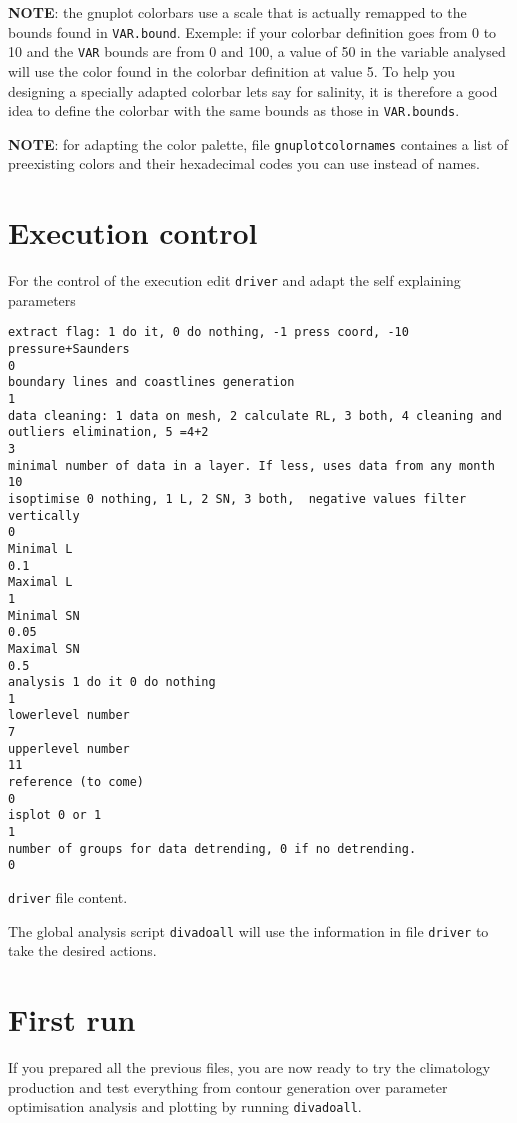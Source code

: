 \documentclass[8pt,a4paper,notitlepage]{book}
\begin{document}
{\bf NOTE}: the gnuplot colorbars use a scale that is actually remapped to the bounds found in {\tt VAR.bound}. Exemple:
if your colorbar definition goes from 0 to 10 and the {\tt VAR} bounds are from 0 and 100, a value of 50 in the variable analysed will use the color found in the colorbar definition at value 5. To help you designing a specially adapted colorbar lets say for salinity, it is therefore a good idea to define the colorbar with the same bounds as those in {\tt VAR.bounds}.

{\bf NOTE}: for adapting the color palette, file {\tt gnuplotcolornames} containes a list of preexisting colors and their hexadecimal codes you can use instead of names.


\section{Execution control}



For the control of the execution edit {\tt driver} and adapt the self explaining parameters
\begin{exfile}[H]
\begin{footnotesize}
\begin{verbatim}
extract flag: 1 do it, 0 do nothing, -1 press coord, -10 pressure+Saunders
0
boundary lines and coastlines generation
1
data cleaning: 1 data on mesh, 2 calculate RL, 3 both, 4 cleaning and outliers elimination, 5 =4+2
3
minimal number of data in a layer. If less, uses data from any month
10
isoptimise 0 nothing, 1 L, 2 SN, 3 both,  negative values filter vertically
0
Minimal L
0.1
Maximal L
1
Minimal SN
0.05
Maximal SN
0.5
analysis 1 do it 0 do nothing
1
lowerlevel number
7
upperlevel number
11
reference (to come)
0
isplot 0 or 1
1
number of groups for data detrending, 0 if no detrending.
0
\end{verbatim}
\end{footnotesize}
\caption{{\tt driver} file content.} 
\end{exfile}



The global analysis script {\tt divadoall} will use the information in file {\tt driver} to take the desired actions.

\section{First run}

If you prepared all the previous files, you are now ready to try the climatology production and test 
everything from contour generation over parameter optimisation analysis and plotting
by running  {\tt divadoall}.
\end{document}
